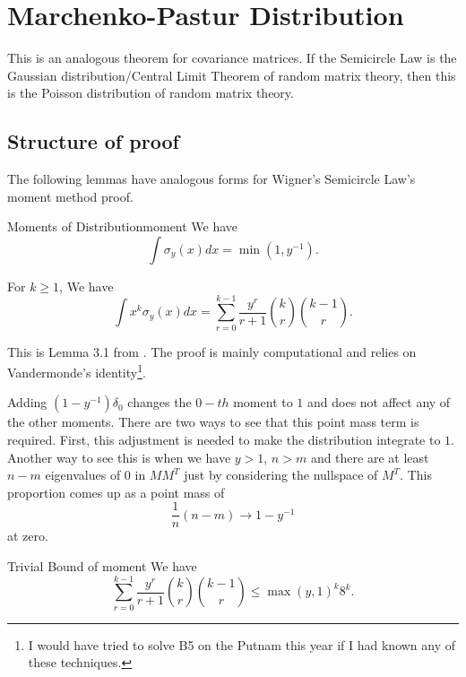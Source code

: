 \section{Marchenko-Pastur Distribution}
This is an analogous theorem for covariance matrices. If the Semicircle Law is the Gaussian distribution/Central Limit Theorem of random matrix theory, then this is the Poisson distribution of random matrix theory.

\subsection*{Structure of proof}
The following lemmas have analogous forms for Wigner's Semicircle Law's moment method proof.
\begin{alemma}{Moments of Distribution}{moment}
We have \[
    \int \sigma_y(x) dx  = \min(1, y^{-1}).
\]

For $k\geq 1$, We have \[
\int x^k \sigma_y(x) dx  =  \sum_{r=0}^{k-1}\frac{y^r}{r+1} \binom{k}{r}\binom{k-1}{r}.
\]
\end{alemma}
This is Lemma 3.1 from \cite{BS}. The proof is mainly computational and relies on Vandermonde's identity\footnote{I would have tried to solve B5 on the Putnam this year if I had known any of these techniques.}.
\begin{remark}
    Adding $(1-y^{-1})\delta_0$ changes the $0-th$ moment to $1$ and does not affect any of the other moments. There are two ways to see that this point mass term is required. 
    First, this adjustment is needed to make the distribution integrate to $1$. Another way to see this is when we have $y>1$, $n>m$ and there are at least $n-m$ eigenvalues of $0$ in $MM^T$ just by considering the nullspace of $M^T$. This proportion comes up as a point mass of \[
    \frac{1}{n}(n-m) \to 1-y^{-1}
    \] at zero.
\end{remark}
\begin{alemma}{Trivial Bound of moment}{}
    We have \[
        \sum_{r=0}^{k-1}\frac{y^r}{r+1} \binom{k}{r}\binom{k-1}{r} \leq  \max(y,1)^k 8^k.
    \]
\end{alemma}

